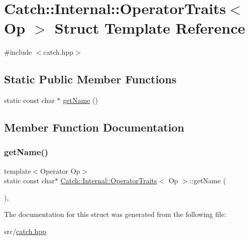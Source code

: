 \hypertarget{struct_catch_1_1_internal_1_1_operator_traits}{}\section{Catch\+:\+:Internal\+:\+:Operator\+Traits$<$ Op $>$ Struct Template Reference}
\label{struct_catch_1_1_internal_1_1_operator_traits}


{\ttfamily \#include $<$catch.\+hpp$>$}

\subsection*{Static Public Member Functions}
\begin{DoxyCompactItemize}
\item 
static const char $\ast$ \hyperlink{struct_catch_1_1_internal_1_1_operator_traits_ac6d08082ea33348d42bc4ccbd6d07671}{get\+Name} ()
\end{DoxyCompactItemize}


\subsection{Member Function Documentation}
\mbox{\label{struct_catch_1_1_internal_1_1_operator_traits_ac6d08082ea33348d42bc4ccbd6d07671}} 
\subsubsection{\texorpdfstring{get\+Name()}{getName()}}
{\footnotesize\ttfamily template$<$Operator Op$>$ \\
static const char$\ast$ \hyperlink{struct_catch_1_1_internal_1_1_operator_traits}{Catch\+::\+Internal\+::\+Operator\+Traits}$<$ Op $>$\+::get\+Name (\begin{DoxyParamCaption}{ }\end{DoxyParamCaption})\hspace{0.3cm}{\ttfamily [inline]}, {\ttfamily [static]}}



The documentation for this struct was generated from the following file\+:\begin{DoxyCompactItemize}
\item 
src/\hyperlink{catch_8hpp}{catch.\+hpp}\end{DoxyCompactItemize}
